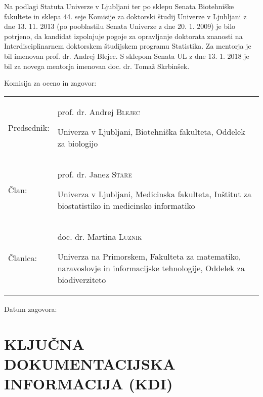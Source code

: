 \newpage
{}
\setcounter{page}{2}

Na podlagi Statuta Univerze v Ljubljani ter po sklepu Senata Biotehniške fakultete in sklepa 44. seje Komisije za doktorski študij Univerze v Ljubljani z dne 13. 11. 2013 (po pooblastilu Senata Univerze z dne 20. 1. 2009) je bilo potrjeno, da kandidat izpolnjuje pogoje za opravljanje doktorata znanosti na Interdisciplinarnem doktorskem študijskem programu Statistika. Za mentorja je bil imenovan prof. dr. Andrej Blejec. S sklepom Senata UL z dne 13. 1. 2018 je bil za novega mentorja imenovan doc. dr. Tomaž Skrbinšek.

\vspace{4cm}

Komisija za oceno in zagovor:\\

\begin{table}[!ht] %
 \begin{tabular}{>{\raggedright} m{4cm} m{10cm}}
   Predsednik: & prof. dr. Andrej \textsc{Blejec} \par Univerza v Ljubljani, Biotehniška fakulteta, Oddelek za biologijo \\ [10pt]
   Član: & prof. dr. Janez \textsc{Stare} \par Univerza v Ljubljani, Medicinska fakulteta, Inštitut za biostatistiko in medicinsko informatiko \\ [10pt]
   Članica: & doc. dr. Martina \textsc{Lužnik} \par Univerza na Primorskem, Fakulteta za matematiko, naravoslovje in informacijske tehnologije, Oddelek za biodiverziteto \\ [10pt]
 \end{tabular}
\end{table}

\vspace{3cm}

Datum zagovora:

\begin{flushright}
\avtor
\end{flushright}

\newpage
\section*{KLJUČNA DOKUMENTACIJSKA INFORMACIJA (KDI)}

